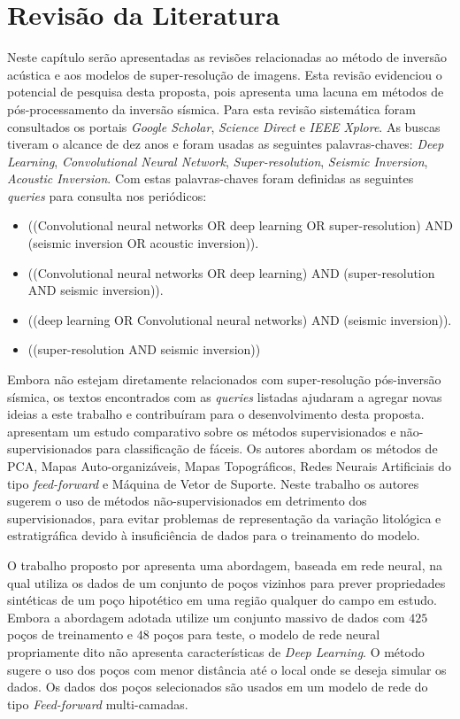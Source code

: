 \chapter{Revisão da Literatura}
\label{cap:3revisaoliteraria}

Neste capítulo serão apresentadas as revisões relacionadas
ao método de inversão acústica e aos modelos de super-resolução de imagens.
Esta revisão evidenciou o potencial de pesquisa desta proposta, pois
apresenta uma lacuna em métodos de pós-processamento da inversão sísmica.
Para esta revisão sistemática foram consultados os portais \textit{Google Scholar}, \textit{Science Direct} e \textit{IEEE Xplore}.
As buscas tiveram o alcance de dez anos e foram usadas as seguintes palavras-chaves: \textit{Deep Learning},
\textit{Convolutional Neural Network}, \textit{Super-resolution}, \textit{Seismic Inversion},
\textit{Acoustic Inversion}. Com estas palavras-chaves foram definidas as seguintes \textit{queries} para consulta nos periódicos:

\begin{itemize}
 \item ((Convolutional neural networks OR deep learning OR super-resolution) AND (seismic inversion OR acoustic inversion)).
 \item ((Convolutional neural networks OR deep learning) AND (super-resolution AND seismic inversion)).
 \item ((deep learning OR Convolutional neural networks) AND (seismic inversion)).
 \item ((super-resolution AND seismic inversion))
\end{itemize}

Embora não estejam diretamente relacionados com super-resolução pós-inversão sísmica,
os textos encontrados com as \textit{queries} listadas ajudaram a agregar novas ideias
a este trabalho e contribuíram para o desenvolvimento desta proposta. 
\cite{ZhaoSAE29} apresentam um estudo comparativo sobre os métodos supervisionados e
não-supervisionados para classificação de fáceis. Os autores abordam os métodos
de PCA, Mapas Auto-organizáveis, Mapas Topográficos, Redes Neurais Artificiais do tipo \textit{feed-forward} e 
Máquina de Vetor de Suporte. Neste trabalho os autores sugerem o uso de métodos não-supervisionados
em detrimento dos supervisionados, para evitar problemas de representação da variação litológica e estratigráfica
devido à insuficiência de dados para o treinamento do modelo.

O trabalho proposto por \cite{Korjani16} apresenta uma abordagem, baseada em rede neural,
na qual utiliza os dados de um conjunto de poços vizinhos para prever
propriedades sintéticas de um poço hipotético em uma região qualquer do campo em estudo.
Embora a abordagem adotada utilize um conjunto massivo de dados com $425$ poços de treinamento
e $48$ poços para teste, o modelo de rede neural propriamente dito não apresenta características de \textit{Deep Learning}.
O método sugere o uso dos poços com menor distância até o local onde se deseja simular os dados. Os dados dos poços
selecionados são usados em um modelo de rede do tipo \textit{Feed-forward} multi-camadas.

